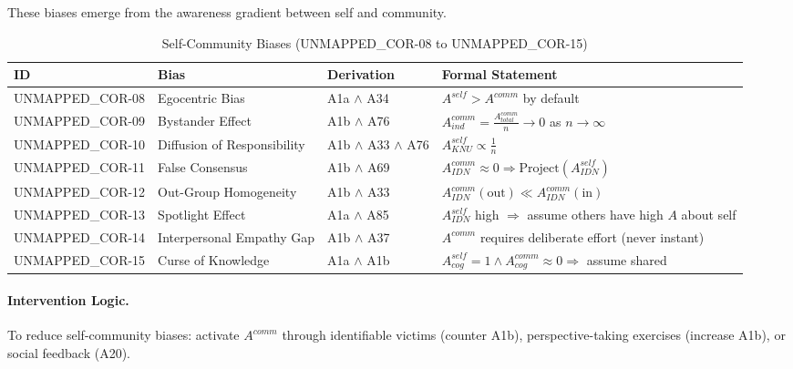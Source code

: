 These biases emerge from the awareness gradient between self and community.

\begin{table}[htbp]
\small
\centering
\caption{Self-Community Biases (UNMAPPED_COR-08 to UNMAPPED_COR-15)}
\label{tab:cor-self-comm}
\begin{tabular}{p{1.2cm}p{2.8cm}p{3.8cm}p{5cm}}
\toprule
\textbf{ID} & \textbf{Bias} & \textbf{Derivation} & \textbf{Formal Statement} \\
\midrule
UNMAPPED_COR-08 & Egocentric Bias & A1a $\land$ A34 & $A^{self} > A^{comm}$ by default \\
UNMAPPED_COR-09 & Bystander Effect & A1b $\land$ A76 & $A^{comm}_{ind} = \frac{A^{comm}_{total}}{n} \to 0$ as $n \to \infty$ \\
UNMAPPED_COR-10 & Diffusion of Responsibility & A1b $\land$ A33 $\land$ A76 & $A^{self}_{KNU} \propto \frac{1}{n}$ \\
UNMAPPED_COR-11 & False Consensus & A1b $\land$ A69 & $A^{comm}_{IDN} \approx 0 \Rightarrow \text{Project}(A^{self}_{IDN})$ \\
UNMAPPED_COR-12 & Out-Group Homogeneity & A1b $\land$ A33 & $A^{comm}_{IDN}(\text{out}) \ll A^{comm}_{IDN}(\text{in})$ \\
UNMAPPED_COR-13 & Spotlight Effect & A1a $\land$ A85 & $A^{self}_{IDN}$ high $\Rightarrow$ assume others have high $A$ about self \\
UNMAPPED_COR-14 & Interpersonal Empathy Gap & A1b $\land$ A37 & $A^{comm}$ requires deliberate effort (never instant) \\
UNMAPPED_COR-15 & Curse of Knowledge & A1a $\land$ A1b & $A^{self}_{cog} = 1 \land A^{comm}_{cog} \approx 0 \Rightarrow$ assume shared \\
\bottomrule
\end{tabular}
\end{table}

\paragraph{Intervention Logic.} To reduce self-community biases: activate $A^{comm}$ through identifiable victims (counter A1b), perspective-taking exercises (increase A1b), or social feedback (A20).


